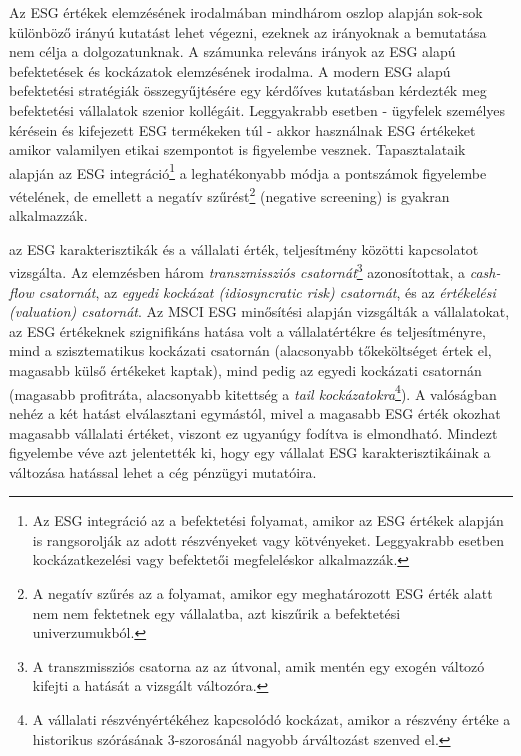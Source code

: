 Az ESG értékek elemzésének irodalmában mindhárom oszlop alapján sok-sok különböző irányú kutatást lehet végezni, ezeknek az irányoknak a bemutatása nem célja a dolgozatunknak. A számunka releváns irányok az ESG alapú befektetések és kockázatok elemzésének irodalma. A modern ESG alapú befektetési stratégiák összegyűjtésére \textcite{amel-zadeh_why_2017} egy kérdőíves kutatásban kérdezték meg befektetési vállalatok szenior kollégáit. Leggyakrabb esetben - ügyfelek személyes kérésein és kifejezett ESG termékeken túl - akkor használnak ESG értékeket amikor valamilyen etikai szempontot is figyelembe vesznek. Tapasztalataik alapján az ESG integráció\footnote{Az ESG integráció az a befektetési folyamat, amikor az ESG értékek alapján is rangsorolják az adott részvényeket vagy kötvényeket. Leggyakrabb esetben kockázatkezelési vagy befektetői megfeleléskor alkalmazzák.} a leghatékonyabb módja a pontszámok figyelembe vételének, de emellett a negatív szűrést\footnote{A negatív szűrés az a folyamat, amikor egy meghatározott ESG érték alatt nem nem fektetnek egy vállalatba, azt kiszűrik a befektetési univerzumukból.} (negative screening) is gyakran alkalmazzák.

\textcite{giese_foundations_2019} az ESG karakterisztikák és a vállalati érték, teljesítmény közötti kapcsolatot vizsgálta. Az elemzésben három \textit{transzmissziós csatornát}\footnote{A transzmissziós csatorna az az útvonal, amik mentén egy exogén változó kifejti a hatását a vizsgált változóra.} azonosítottak, a \textit{cash-flow csatornát}, az \textit{egyedi kockázat (idiosyncratic risk) csatornát}, és az \textit{értékelési (valuation) csatornát}. Az MSCI ESG minősítési alapján vizsgálták a vállalatokat, az ESG értékeknek szignifikáns hatása volt a vállalatértékre és teljesítményre, mind a szisztematikus kockázati csatornán (alacsonyabb tőkeköltséget értek el, magasabb külső értékeket kaptak), mind pedig az egyedi kockázati csatornán (magasabb profitráta, alacsonyabb kitettség a \textit{tail kockázatokra}\footnote{A vállalati részvényértékéhez kapcsolódó kockázat, amikor a részvény értéke a historikus szórásának 3-szorosánál nagyobb árváltozást szenved el.}). A valóságban nehéz a két hatást elválasztani egymástól, mivel a magasabb ESG érték okozhat magasabb vállalati értéket, viszont ez ugyanúgy fodítva is elmondható. Mindezt figyelembe véve azt jelentették ki, hogy egy vállalat ESG karakterisztikáinak a változása hatással lehet a cég pénzügyi mutatóira.

